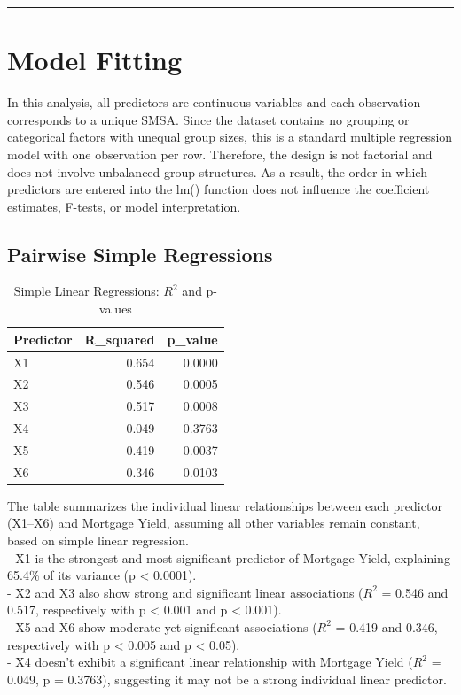 \documentclass[
  11pt,
]{article}
\begin{document}
\begin{center}\rule{0.5\linewidth}{0.5pt}\end{center}

\section{Model Fitting}\label{model-fitting}

In this analysis, all predictors are continuous variables and each
observation corresponds to a unique SMSA. Since the dataset contains no
grouping or categorical factors with unequal group sizes, this is a
standard multiple regression model with one observation per row.
Therefore, the design is not factorial and does not involve unbalanced
group structures. As a result, the order in which predictors are entered
into the lm() function does not influence the coefficient estimates,
F-tests, or model interpretation.

\subsection{Pairwise Simple
Regressions}\label{pairwise-simple-regressions}

\begingroup\fontsize{8}{10}\selectfont

\begin{longtable}[t]{lrr}
\caption{\label{tab:unnamed-chunk-8}Simple Linear Regressions: $R^2$ and p-values}\\
\toprule
Predictor & R\_squared & p\_value\\
\midrule
X1 & 0.654 & 0.0000\\
X2 & 0.546 & 0.0005\\
X3 & 0.517 & 0.0008\\
X4 & 0.049 & 0.3763\\
X5 & 0.419 & 0.0037\\
\addlinespace
X6 & 0.346 & 0.0103\\
\bottomrule
\end{longtable}
\endgroup{}

The table summarizes the individual linear relationships between each
predictor (X1--X6) and Mortgage Yield, assuming all other variables
remain constant, based on simple linear regression.\\
- X1 is the strongest and most significant predictor of Mortgage Yield,
explaining 65.4\% of its variance (p \textless{} 0.0001).\\
- X2 and X3 also show strong and significant linear associations
(\(R^2\) = 0.546 and 0.517, respectively with p \textless{} 0.001 and p
\textless{} 0.001).\\
- X5 and X6 show moderate yet significant associations (\(R^2\) = 0.419
and 0.346, respectively with p \textless{} 0.005 and p \textless{}
0.05).\\
- X4 doesn't exhibit a significant linear relationship with Mortgage
Yield (\(R^2\) = 0.049, p = 0.3763), suggesting it may not be a strong
individual linear predictor.
\end{document}
